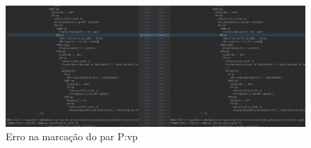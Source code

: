 \begin{figure}[!h]
    \centering
    \includegraphics[width=\textwidth,scale=1.5]{imagens/erro_escrita_498.png}
    \caption[Erro na marcação do par P:vp]{Erro na marcação do par P:vp}
    \label{fig:bosque_erro_pvp}
\end{figure}